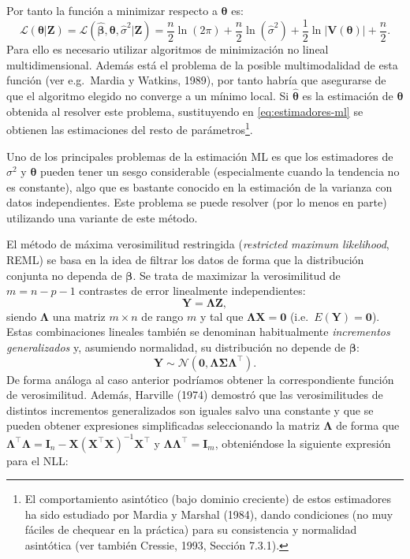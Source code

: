 \documentclass[
  spanish,
]{book}
\theoremstyle{break}
\theoremstyle{definition}
\theoremstyle{definition}
\theoremstyle{definition}
\theoremstyle{definition}
\theoremstyle{remark}
\begin{document}
Por tanto la función a minimizar respecto a \(\boldsymbol{\theta}\) es:
\[\mathcal{L}(\boldsymbol{\theta}\left| \mathbf{Z}\right. )=\mathcal{L}(\hat{\boldsymbol{\beta}} ,\boldsymbol{\theta},\hat{\sigma }^2 \left|
\mathbf{Z}\right. ) = \dfrac{n}{2} \ln (2\pi ) + \dfrac{n}{2} \ln (\hat{\sigma
}^2) + \dfrac{1}{2} \ln \left| \mathbf{V}(\boldsymbol{\theta})\right| +\dfrac{n}{2}.\]
Para ello es necesario utilizar algoritmos de minimización no lineal multidimensional.
Además está el problema de la posible multimodalidad de esta función (ver e.g.~Mardia y Watkins, 1989), por tanto habría que asegurarse de que el algoritmo elegido no converge a un mínimo local.
Si \(\hat{\boldsymbol{\theta}}\) es la estimación de \(\boldsymbol{\theta}\) obtenida al resolver este problema, sustituyendo en \eqref{eq:estimadores-ml} se obtienen las estimaciones del resto de parámetros\footnote{El comportamiento asintótico (bajo dominio creciente) de estos estimadores ha sido estudiado por Mardia y Marshal (1984), dando condiciones (no muy fáciles de chequear en la práctica) para su consistencia y normalidad asintótica (ver también Cressie, 1993, Sección 7.3.1).}.

Uno de los principales problemas de la estimación ML es que los estimadores de \(\sigma^2\) y \(\boldsymbol{\theta}\) pueden tener un sesgo considerable (especialmente cuando la tendencia no es constante), algo que es bastante conocido en la estimación de la varianza con datos independientes.
Este problema se puede resolver (por lo menos en parte) utilizando una variante de este método.

El método de máxima verosimilitud restringida (\emph{restricted maximum likelihood}, REML) se basa en la idea de filtrar los datos de forma que la distribución conjunta no dependa de \(\boldsymbol{\beta}\).
Se trata de maximizar la verosimilitud de \(m=n-p-1\) contrastes de error linealmente independientes:
\[\mathbf{Y}=\boldsymbol{\Lambda}\mathbf{Z},\]
siendo \(\boldsymbol{\Lambda}\) una matriz \(m\times n\) de rango \(m\) y tal que \(\boldsymbol{\Lambda}\mathbf{X}=\mathbf{0}\) (i.e.~\(E(\mathbf{Y}) = \mathbf{0}\)).
Estas combinaciones lineales también se denominan habitualmente \emph{incrementos generalizados} y, asumiendo normalidad, su distribución no depende de \(\boldsymbol{\beta}\):
\[\mathbf{Y}\sim \mathcal{N}(\mathbf{0},\boldsymbol{\Lambda}\boldsymbol{\Sigma}\boldsymbol{\Lambda}^\top).\]
De forma análoga al caso anterior podríamos obtener la correspondiente función de verosimilitud. Además, Harville (1974) demostró que las verosimilitudes de distintos incrementos generalizados son iguales salvo una constante y que se pueden obtener expresiones simplificadas
seleccionando la matriz \(\boldsymbol{\Lambda}\) de forma que \(\boldsymbol{\Lambda}^\top \boldsymbol{\Lambda}=\mathbf{I}_{n} -\mathbf{X}(\mathbf{X^\top}\mathbf{X})^{-1} \mathbf{X}^\top\) y \(\boldsymbol{\Lambda}\boldsymbol{\Lambda}^\top =\mathbf{I}_{m}\), obteniéndose la siguiente expresión para el NLL:
\end{document}
